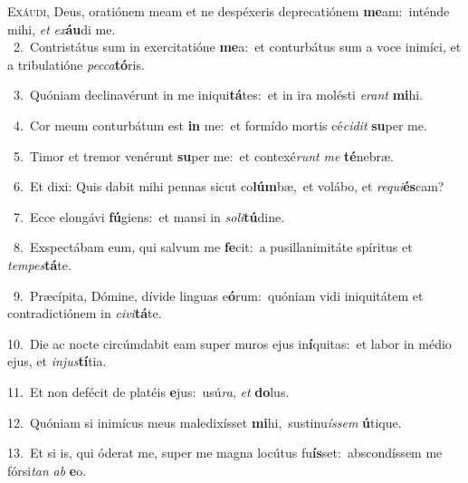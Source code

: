 \lettrine{\initial\textcolor{\initialcolor}{E}}{xáudi,} Deus, oratiónem meam et ne despéxeris deprecatiónem \textbf{me}\-am:~\star inténde mihi, \textit{et} \textit{ex}\-\textbf{áu}di me.\\
{\numbfont\textcolor{\numbcolor}{~2.}}~Contristátus sum in exercitatióne \textbf{me}\-a:~\star et conturbátus sum a voce inimíci, et a tribulatióne \textit{pec}\-\textit{ca}\textbf{tó}ris.\par
{\numbfont\textcolor{\numbcolor}{~3.}}~Quóniam declinavérunt in me iniqui\-\textbf{tá}\-tes:~\star et in ira molésti \textit{e}\-\textit{rant} \textbf{mi}\-hi.\par
{\numbfont\textcolor{\numbcolor}{~4.}}~Cor meum conturbátum est \textbf{in} me:~\star et formído mortis cé\-\textit{ci}\-\textit{dit} \textbf{su}\-per me.\par
{\numbfont\textcolor{\numbcolor}{~5.}}~Timor et tremor venérunt \textbf{su}\-per me:~\star et contexé\textit{runt} \textit{me} \textbf{té}\-nebræ.\par
{\numbfont\textcolor{\numbcolor}{~6.}}~Et dixi: Quis dabit mihi pennas sicut co\-\textbf{lúm}\-bæ,~\star et volábo, et \textit{re}\-\textit{qui}\textbf{és}cam?\par
{\numbfont\textcolor{\numbcolor}{~7.}}~Ecce elongávi \textbf{fú}\-giens:~\star et mansi in \textit{so}\-\textit{li}\textbf{tú}dine.\par
{\numbfont\textcolor{\numbcolor}{~8.}}~Exspectábam eum, qui salvum me \textbf{fe}\-cit:~\star a pusillanimitáte spíritus et \textit{tem}\-\textit{pes}\textbf{tá}te.\par
{\numbfont\textcolor{\numbcolor}{~9.}}~Præcípita, Dómine, dívide linguas e\-\textbf{ó}\-rum:~\star quóniam vidi iniquitátem et contradictiónem in \textit{ci}\-\textit{vi}\textbf{tá}te.\par
{\numbfont\textcolor{\numbcolor}{10.}}~Die ac nocte circúmdabit eam super muros ejus in\-\textbf{í}\-quitas:~\star et labor in médio ejus, et \textit{in}\-\textit{jus}\textbf{tí}tia.\par
{\numbfont\textcolor{\numbcolor}{11.}}~Et non defécit de platéis \textbf{e}\-jus:~\star usú\-\textit{ra}\-, \textit{et} \textbf{do}\-lus.\par
{\numbfont\textcolor{\numbcolor}{12.}}~Quóniam si inimícus meus maledixísset \textbf{mi}\-hi,~\star sustinu\-\textit{ís}\-\textit{sem} \textbf{ú}\-tique.\par
{\numbfont\textcolor{\numbcolor}{13.}}~Et si is, qui óderat me, super me magna locútus fu\-\textbf{ís}\-set:~\star abscondíssem me fórsi\textit{tan} \textit{ab} \textbf{e}\-o.\par
